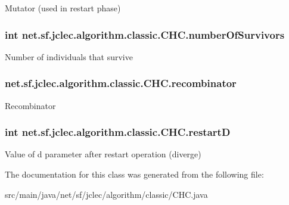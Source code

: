 Mutator (used in restart phase) \hypertarget{classnet_1_1sf_1_1jclec_1_1algorithm_1_1classic_1_1_c_h_c_a1b2005c9606fa0bd250efda96aa078d9}{
\subsubsection[{number\-Of\-Survivors}]{\setlength{\rightskip}{0pt plus 5cm}int net.\-sf.\-jclec.\-algorithm.\-classic.\-C\-H\-C.\-number\-Of\-Survivors\hspace{0.3cm}{\ttfamily [protected]}}}\label{classnet_1_1sf_1_1jclec_1_1algorithm_1_1classic_1_1_c_h_c_a1b2005c9606fa0bd250efda96aa078d9}
Number of individuals that survive \hypertarget{classnet_1_1sf_1_1jclec_1_1algorithm_1_1classic_1_1_c_h_c_ab57efc757b80ad7047b60477e7329718}{
\subsubsection[{recombinator}]{ net.\-sf.\-jclec.\-algorithm.\-classic.\-C\-H\-C.\-recombinator\hspace{0.3cm}{\ttfamily [protected]}}}\label{classnet_1_1sf_1_1jclec_1_1algorithm_1_1classic_1_1_c_h_c_ab57efc757b80ad7047b60477e7329718}
Recombinator \hypertarget{classnet_1_1sf_1_1jclec_1_1algorithm_1_1classic_1_1_c_h_c_a6cd78db6a675d92c105ee5e4cf5abe68}{
\subsubsection[{restart\-D}]{\setlength{\rightskip}{0pt plus 5cm}int net.\-sf.\-jclec.\-algorithm.\-classic.\-C\-H\-C.\-restart\-D\hspace{0.3cm}{\ttfamily [protected]}}}\label{classnet_1_1sf_1_1jclec_1_1algorithm_1_1classic_1_1_c_h_c_a6cd78db6a675d92c105ee5e4cf5abe68}
Value of d parameter after restart operation (diverge) 

The documentation for this class was generated from the following file\-:\begin{DoxyCompactItemize}
\item 
src/main/java/net/sf/jclec/algorithm/classic/C\-H\-C.\-java\end{DoxyCompactItemize}
